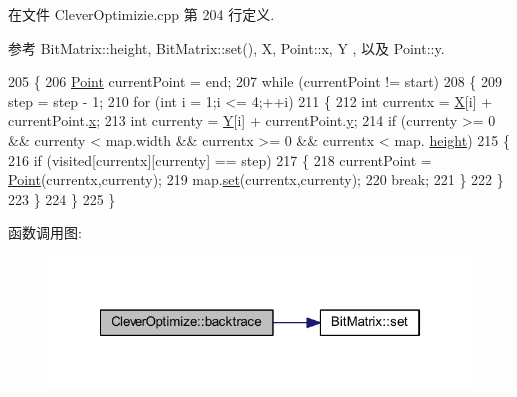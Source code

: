 在文件 Clever\+Optimizie.\+cpp 第 204 行定义.



参考 Bit\+Matrix\+::height, Bit\+Matrix\+::set(), X, Point\+::x, Y , 以及 Point\+::y.


\begin{DoxyCode}
205 \{
206     \hyperlink{classPoint}{Point} currentPoint = end;
207     \textcolor{keywordflow}{while} (currentPoint != start)
208     \{
209         step = step - 1;
210         \textcolor{keywordflow}{for} (\textcolor{keywordtype}{int} i = 1;i <= 4;++i)
211         \{
212             \textcolor{keywordtype}{int} currentx = \hyperlink{CleverOptimizie_8cpp_a34adaf40bb2f109e151ba28ccc73c677}{X}[i] + currentPoint.\hyperlink{classPoint_a8c779e11e694b20e0946105a9f5de842}{x};
213             \textcolor{keywordtype}{int} currenty = \hyperlink{CleverOptimizie_8cpp_a86f15c23d2ab23bfebe784c368885663}{Y}[i] + currentPoint.\hyperlink{classPoint_a2e1b5fb2b2a83571f5c0bc0f66a73cf7}{y};
214             \textcolor{keywordflow}{if} (currenty >= 0 && currenty < map.width && currentx >= 0 && currentx < map.
      \hyperlink{classBitMatrix_a3b7a1be96313cacfd3b2a08661dd919c}{height})
215             \{
216                 \textcolor{keywordflow}{if} (visited[currentx][currenty] == step)
217                 \{
218                     currentPoint = \hyperlink{classPoint}{Point}(currentx,currenty);
219                     map.\hyperlink{classBitMatrix_ad26dd2e93e9d24d70834d6d79e29c81e}{set}(currentx,currenty);
220                     \textcolor{keywordflow}{break};
221                 \}
222             \}
223         \}
224     \}
225 \}
\end{DoxyCode}


函数调用图\+:
\nopagebreak
\begin{figure}[H]
\begin{center}
\leavevmode
\includegraphics[width=322pt]{classCleverOptimize_ad4df8b31e69546d22b2066d33ef57c81_cgraph}
\end{center}
\end{figure}


